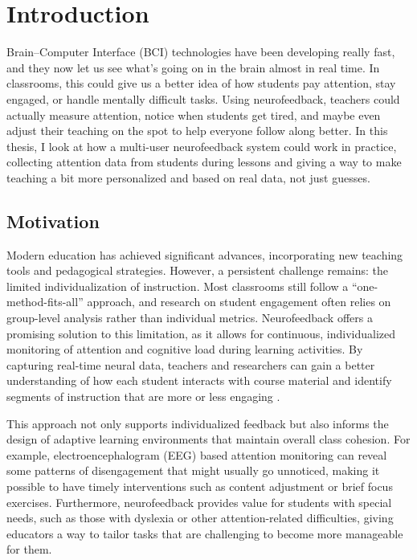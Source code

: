\chapter{Introduction}\label{cap:intro}
Brain–Computer Interface (BCI) technologies have been developing really fast, and they now let us see what’s going on in the brain almost in real time. In classrooms, this could give us a better idea of how students pay attention, stay engaged, or handle mentally difficult tasks. Using neurofeedback, teachers could actually measure attention, notice when students get tired, and maybe even adjust their teaching on the spot to help everyone follow along better. In this thesis, I look at how a multi-user neurofeedback system could work in practice, collecting attention data from students during lessons and giving a way to make teaching a bit more personalized and based on real data, not just guesses.



\section{Motivation}\label{sect:mot}
Modern education has achieved significant advances, incorporating new teaching tools and pedagogical strategies. However, a persistent challenge remains: the limited individualization of instruction. Most classrooms still follow a “one-method-fits-all” approach, and research on student engagement often relies on group-level analysis rather than individual metrics. Neurofeedback offers a promising solution to this limitation, as it allows for continuous, individualized monitoring of attention and cognitive load during learning activities. By capturing real-time neural data, teachers and researchers can gain a better understanding of how each student interacts with course material and identify segments of instruction that are more or less engaging \cite{Apicella2022}.


This approach not only supports individualized feedback but also informs the design of adaptive learning environments that maintain overall class cohesion. For example, electroencephalogram (EEG) based attention monitoring can reveal some patterns of disengagement that might usually go unnoticed, making it possible to have timely interventions such as content adjustment or brief focus exercises. Furthermore, neurofeedback provides value for students with special needs, such as those with dyslexia or other attention-related difficulties, giving educators a way to tailor tasks that are challenging to become more manageable for them.


